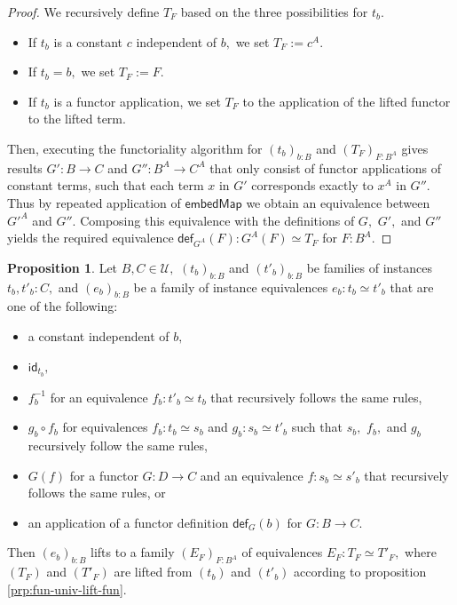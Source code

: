 \documentclass[a4paper]{article}
\theoremstyle{definition}
\newtheorem{proposition}[definition]{Proposition}
\theoremstyle{remark}
\renewcommand{\equiv}{\simeq}
\newcommand{\U}{\mathcal{U}}
\newcommand{\nm}{\mathsf}
\newcommand{\id}{\nm{id}}
\newcommand{\fndef}[1]{\nm{def}_{#1}}
\begin{document}
\begin{proof}
  We recursively define $T_F$ based on the three possibilities for $t_b.$
  \begin{itemize}
    \item If $t_b$ is a constant $c$ independent of $b,$ we set $T_F := c^A.$
    \item If $t_b = b,$ we set $T_F := F.$
    \item If $t_b$ is a functor application, we set $T_F$ to the application of
    the lifted functor to the lifted term.
  \end{itemize}
  Then, executing the functoriality algorithm for $(t_b)_{b : B}$ and
  $(T_F)_{F : B^A}$ gives results $G' : B \to C$ and $G'' : B^A \to C^A$ that
  only consist of functor applications of constant terms, such that each term
  $x$ in $G'$ corresponds exactly to $x^A$ in $G''.$ Thus by repeated application
  of $\nm{embedMap}$ we obtain an equivalence between $G'^A$ and $G''.$ Composing
  this equivalence with the definitions of $G,$ $G',$ and $G''$ yields the
  required equivalence $\fndef{G^A}(F) : G^A(F) \equiv T_F$ for $F : B^A.$
\end{proof}

\begin{proposition}
  \label{prp:fun-univ-lift-equiv}
  Let $B,C \in \U,$ $(t_b)_{b : B}$ and $(t'_b)_{b : B}$ be families of instances
  $t_b,t'_b : C,$ and $(e_b)_{b : B}$ be a family of instance equivalences
  $e_b : t_b \equiv t'_b$ that are one of the following:
  \begin{itemize}
    \item a constant independent of $b,$
    \item $\id_{t_b},$
    \item $f_b^{-1}$ for an equivalence $f_b : t'_b \equiv t_b$ that recursively
    follows the same rules,
    \item $g_b \circ f_b$ for equivalences $f_b : t_b \equiv s_b$ and
    $g_b : s_b \equiv t'_b$ such that $s_b,$ $f_b,$ and $g_b$ recursively
    follow the same rules,
    \item $G(f)$ for a functor $G : D \to C$ and an equivalence
    $f : s_b \equiv s'_b$ that recursively follows the same rules, or
    \item an application of a functor definition $\fndef{G}(b)$ for $G : B \to C.$
  \end{itemize}
  Then $(e_b)_{b : B}$ lifts to a family $(E_F)_{F : B^A}$ of equivalences
  $E_F : T_F \equiv T'_F,$ where $(T_F)$ and $(T'_F)$ are lifted from $(t_b)$
  and $(t'_b)$ according to proposition \ref{prp:fun-univ-lift-fun}.
\end{proposition}
\end{document}
